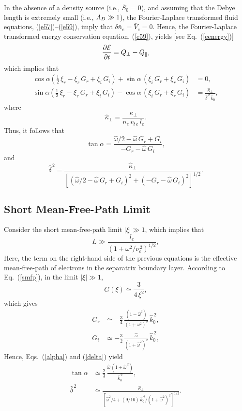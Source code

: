 \documentclass[12pt,prb,aps]{revtex4-1}
\begin{document}
In the absence of a density source (i.e., $\bar{S}_0=0$), and assuming that the Debye length is extremely small (i.e., ${\mit\Lambda}_D\gg 1$), the Fourier-Laplace transformed fluid equations, (\ref{e57})--(\ref{e59}), imply that $\delta\bar{n}_e=\bar{V}_e=0$. Hence, the Fourier-Laplace transformed energy conservation equation, (\ref{e59}), yields 
 [see Eq.~(\ref{eenergy})]
\begin{equation}
\frac{\partial{\cal E}}{\partial t} = Q_\perp-Q_\parallel,
\end{equation}
which implies that
\begin{align}
\cos\alpha\left(\frac{1}{2}\,\xi_r-\xi_r\,G_r+\xi_i\,G_i\right)+\sin\alpha\,(\xi_i\,G_r+\xi_r\,G_i) &= 0,\\[0.5ex]
\sin\alpha\left(\frac{1}{2}\,\xi_r-\xi_r\,G_r+\xi_i\,G_i\right)-\cos\alpha\,(\xi_i\,G_r+\xi_r\,G_i)&= \frac{\hat{\kappa}_\perp}{\hat{\delta}^{\,2}\,\hat{k}_0},
\end{align}
where
\begin{equation}
\hat{\kappa}_\perp =\frac{\kappa_\perp}{n_e\,v_{t\,e}\,l_e}.
\end{equation}
Thus, it follows that
\begin{equation}\label{alpha}
\tan\alpha = \frac{\hat{\omega}/2 -\hat{\omega}\,G_r + G_i}{-G_r-\hat{\omega}\,G_i},
\end{equation}
and
\begin{equation}\label{delta}
\hat{\delta}^{\,2} = \frac{\hat{\kappa}_\perp}{[(\hat{\omega}/2 - \hat{\omega}\,G_r+G_i)^2 + (-G_r-\hat{\omega}\,G_i)^2]^{1/2}}.
\end{equation}

\subsection{Short Mean-Free-Path Limit}
Consider the short mean-free-path limit $|\xi|\gg 1$, which implies that
\begin{equation}
L\gg \frac{l_e}{(1+\omega^2/\nu_e^{\,2})^{1/2}},
\end{equation}
Here, the term on the right-hand side of the previous equations is the effective mean-free-path of electrons in the separatrix boundary layer. According to Eq.~(\ref{smfp}), in the limit
$|\xi|\gg 1$, 
\begin{equation}
G(\xi)\simeq \frac{3}{4\,\xi^2},
\end{equation}
which gives
\begin{align}
G_r &\simeq  -\frac{3}{4}\,\frac{(1-\hat{\omega}^2)}{(1+\omega^2)^2}\,\hat{k}_0^{\,2},\\[0.5ex]
G_i &\simeq -\frac{3}{2}\,\frac{\hat{\omega}}{(1+\hat{\omega}^2)^2}\,\hat{k}_0^{\,2},
\end{align}
Hence, Eqs.~(\ref{alpha}) and (\ref{delta}) yield
\begin{align}\label{al}
\tan\alpha&\simeq \frac{2}{3}\,\frac{\hat{\omega}\,(1+\hat{\omega}^{\,2})}{\hat{k}_0^{\,2}},\\[0.5ex]
\hat{\delta}^{\,2} &\simeq \frac{\hat{\kappa}_\perp}{[\hat{\omega}^2/4 + (9/16)\,\hat{k}_0^{\,4}/(1+\hat{\omega}^2)^2]^{1/2}}.\label{del}
\end{align}
\end{document}
